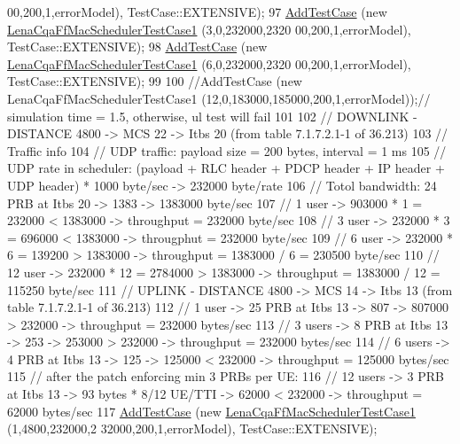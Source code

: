 \begin{DoxyCode}
      00,200,1,errorModel), TestCase::EXTENSIVE);
97   \hyperlink{classns3_1_1TestCase_a3718088e3eefd5d6454569d2e0ddd835}{AddTestCase} (\textcolor{keyword}{new} \hyperlink{classLenaCqaFfMacSchedulerTestCase1}{LenaCqaFfMacSchedulerTestCase1} (3,0,232000,2320
      00,200,1,errorModel), TestCase::EXTENSIVE);
98   \hyperlink{classns3_1_1TestCase_a3718088e3eefd5d6454569d2e0ddd835}{AddTestCase} (\textcolor{keyword}{new} \hyperlink{classLenaCqaFfMacSchedulerTestCase1}{LenaCqaFfMacSchedulerTestCase1} (6,0,232000,2320
      00,200,1,errorModel), TestCase::EXTENSIVE);
99 
100   \textcolor{comment}{//AddTestCase (new LenaCqaFfMacSchedulerTestCase1 (12,0,183000,185000,200,1,errorModel));// simulation
       time = 1.5, otherwise, ul test will fail}
101 
102   \textcolor{comment}{// DOWNLINK - DISTANCE 4800 -> MCS 22 -> Itbs 20 (from table 7.1.7.2.1-1 of 36.213)}
103   \textcolor{comment}{// Traffic info}
104   \textcolor{comment}{//   UDP traffic: payload size = 200 bytes, interval = 1 ms}
105   \textcolor{comment}{//   UDP rate in scheduler: (payload + RLC header + PDCP header + IP header + UDP header) * 1000 byte/sec
       -> 232000 byte/rate }
106   \textcolor{comment}{// Totol bandwidth: 24 PRB at Itbs 20 -> 1383 -> 1383000 byte/sec}
107   \textcolor{comment}{// 1 user -> 903000 * 1 = 232000 < 1383000 -> throughput = 232000 byte/sec}
108   \textcolor{comment}{// 3 user -> 232000 * 3 = 696000 < 1383000 -> througphut = 232000 byte/sec}
109   \textcolor{comment}{// 6 user -> 232000 * 6 = 139200 > 1383000 -> throughput = 1383000 / 6 = 230500 byte/sec}
110   \textcolor{comment}{// 12 user -> 232000 * 12 = 2784000 > 1383000 -> throughput =  1383000 / 12 = 115250 byte/sec}
111   \textcolor{comment}{// UPLINK - DISTANCE 4800 -> MCS 14 -> Itbs 13 (from table 7.1.7.2.1-1 of 36.213)}
112   \textcolor{comment}{// 1 user -> 25 PRB at Itbs 13 -> 807 -> 807000 > 232000 -> throughput = 232000 bytes/sec}
113   \textcolor{comment}{// 3 users -> 8 PRB at Itbs 13 -> 253 -> 253000 > 232000 -> throughput = 232000 bytes/sec}
114   \textcolor{comment}{// 6 users -> 4 PRB at Itbs 13 -> 125 -> 125000 < 232000 -> throughput = 125000 bytes/sec}
115   \textcolor{comment}{// after the patch enforcing min 3 PRBs per UE:}
116   \textcolor{comment}{// 12 users -> 3 PRB at Itbs 13 -> 93  bytes * 8/12 UE/TTI  -> 62000 < 232000 -> throughput = 62000 
       bytes/sec}
117   \hyperlink{classns3_1_1TestCase_a3718088e3eefd5d6454569d2e0ddd835}{AddTestCase} (\textcolor{keyword}{new} \hyperlink{classLenaCqaFfMacSchedulerTestCase1}{LenaCqaFfMacSchedulerTestCase1} (1,4800,232000,2
      32000,200,1,errorModel), TestCase::EXTENSIVE);

\end{DoxyCode}
